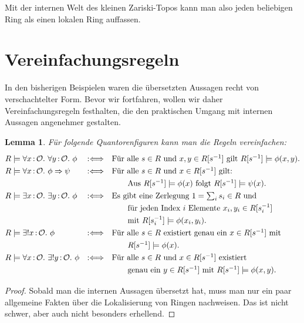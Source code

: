 \documentclass[a4paper,ngerman,12pt]{scrartcl}
\theoremstyle{definition}
\theoremstyle{plain}
\newtheorem{lemma}[defn]{Lemma}
\theoremstyle{remark}
\renewcommand{\O}{\mathcal{O}}
\renewcommand{\_}{\mathpunct{.}\,}
\newcommand{\?}{\,{:}\,}
\begin{document}
Mit der internen Welt des kleinen Zariski-Topos kann man also jeden
beliebigen Ring als einen lokalen Ring auffassen.


\section{Vereinfachungsregeln}

In den bisherigen Beispielen waren die übersetzten Aussagen recht
von verschachtelter Form. Bevor wir fortfahren, wollen wir daher
Vereinfachungsregeln festhalten, die den praktischen Umgang mit internen
Aussagen angenehmer gestalten.

\begin{lemma}\label{vereinfachung}%
Für folgende Quantorenfiguren kann man die Regeln vereinfachen:
\[\renewcommand{\arraystretch}{1.3}\begin{array}{@{}lcl@{}}
  R \models \forall x\?\O\_ \forall y\?\O\_ \phi &\Ll&
    \text{Für alle~$s \in R$ und~$x,y \in R[s^{-1}]$ gilt~$R[s^{-1}] \models
    \phi(x,y)$.} \\
  R \models \forall x\?\O\_ \phi \Rightarrow \psi &\Ll&
    \text{Für alle~$s \in R$ und~$x \in R[s^{-1}]$ gilt:} \\
  &&{\quad\quad} \text{Aus $R[s^{-1}] \models \phi(x)$ folgt $R[s^{-1}] \models \psi(x)$.} \\
  R \models \exists x\?\O\_ \exists y\?\O\_ \phi &\Ll&
    \text{Es gibt eine Zerlegung~$1 = \sum_i s_i \in R$ und} \\
  &&{\quad\quad} \text{für jeden Index~$i$ Elemente~$x_i, y_i \in R[s_i^{-1}]$} \\
  &&{\quad\quad} \text{mit $R[s_i^{-1}] \models \phi(x_i,y_i)$.} \\
  R \models \exists!x \? \O\_ \phi &\Ll&
    \text{Für alle~$s \in R$ existiert genau ein~$x \in R[s^{-1}]$ mit} \\
  &&{\quad\quad} R[s^{-1}] \models \phi(x). \\
  R \models \forall x\?\O\_ \exists! y\?\O\_ \phi &\Ll&
    \text{Für alle~$s \in R$ und~$x \in R[s^{-1}]$ existiert} \\
  &&{\quad\quad} \text{genau ein~$y \in R[s^{-1}]$ mit $R[s^{-1}] \models
  \phi(x,y)$.}
\end{array}\]
\end{lemma}
\begin{proof}Sobald man die internen Aussagen übersetzt hat, muss man nur ein
paar allgemeine Fakten über die Lokalisierung von Ringen nachweisen. Das ist
nicht schwer, aber auch nicht besonders erhellend.\end{proof}
\end{document}
